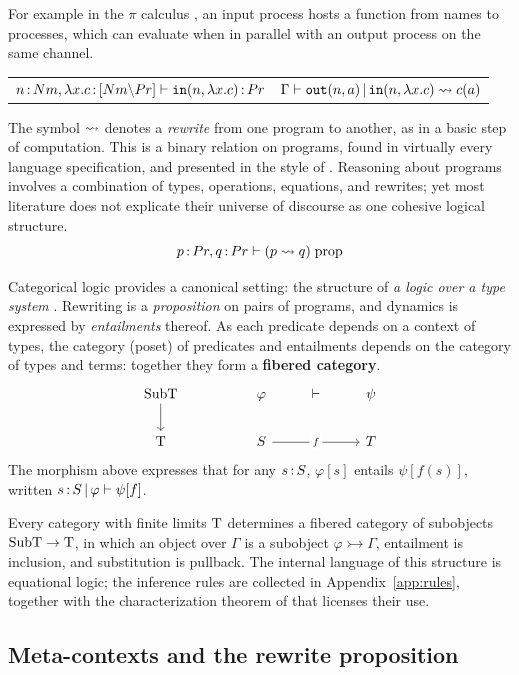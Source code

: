\documentclass{article}
\begin{document}
For example in the $\pi$ calculus \citep{pi}, an input process hosts a function from names to processes, which can evaluate when in parallel with an output process on the same channel.
\begin{center}
    \begin{tabular}{c@{\qquad\qquad}c}
         $n\,{:}\, Nm, \lambda x.c\,{:}\, [Nm{\setminus} Pr] \vdash \mathtt{in}(n,\lambda x.c)\,{:}\, Pr$ &
         $\Gamma\vdash \mathtt{out}(n,a)\,|\, \mathtt{in}(n,\lambda x.c)\rightsquigarrow c(a)$
    \end{tabular}
\end{center}
The symbol $\rightsquigarrow$ denotes a \textit{rewrite} from one program to another, as in a basic step of computation. This is a binary relation on programs, found in virtually every language specification, and presented in the style of \citet{sos}. Reasoning about programs involves a combination of types, operations, equations, and rewrites; yet most literature does not explicate their universe of discourse as one cohesive logical structure.
\[p\,{:}\, Pr, q\,{:}\, Pr\vdash (p\rightsquigarrow q)\; \mathrm{prop}\]

Categorical logic provides a canonical setting: the structure of \textit{a logic over a type system} \citep{fibcat}. Rewriting is a \textit{proposition} on pairs of programs, and dynamics is expressed by \textit{entailments} thereof. As each predicate depends on a context of types, the category (poset) of predicates and entailments depends on the category of types and terms: together they form a \textbf{fibered category}.
\[\begin{tikzcd}
	{\mrm{SubT}} && \varphi & \vdash & \psi \\
	{\mrm{T}} && S && T
	\arrow[from=1-1, to=2-1]
	\arrow["f"{description}, from=2-3, to=2-5]
\end{tikzcd}\]
The morphism above expresses that for any $s\,{:}\, S$, $\varphi[s]$ entails $\psi[f(s)]$, written $s\,{:}\, S\,|\, \varphi \vdash \psi[f]$.

Every category with finite limits $\mathrm{T}$ determines a fibered category of subobjects $\mathrm{Sub}\mathrm{T}\to \mathrm{T}$, in which an object over $\Gamma$ is a subobject $\varphi \rightarrowtail \Gamma$, entailment is inclusion, and substitution is pullback. The internal language of this structure is equational logic; the inference rules are collected in Appendix~\ref{app:rules}, together with the characterization theorem of \citet{fibcat} that licenses their use.

\subsection{Meta-contexts and the rewrite proposition}
\end{document}
